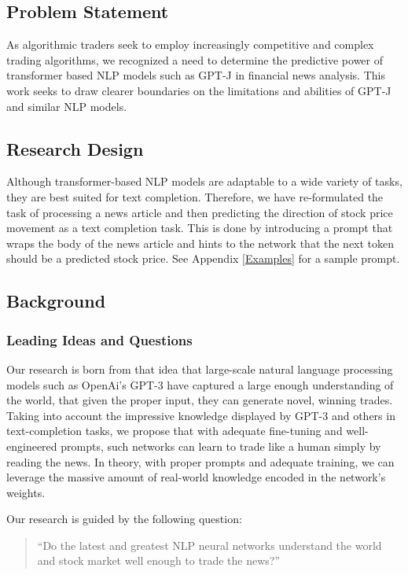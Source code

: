 \documentclass[conference]{IEEEtran}
\begin{document}
\subsection{Problem Statement}
As algorithmic traders seek to employ increasingly competitive and complex trading algorithms, we recognized a need to determine the predictive power of transformer based NLP models such as GPT-J\cite{mesh-transformer-jax} in financial news analysis. This work seeks to draw clearer boundaries on the limitations and abilities of GPT-J and similar NLP models.

\subsection{Research Design}
Although transformer-based NLP models are adaptable to a wide variety of tasks, they are best suited for text completion. Therefore, we have re-formulated the task of processing a news article and then predicting the direction of stock price movement as a text completion task. This is done by introducing a prompt that wraps the body of the news article and hints to the network that the next token should be a predicted stock price. See Appendix \ref{Examples} for a sample prompt.

\subsection{Background}
\subsubsection{Leading Ideas and Questions}
Our research is born from that idea that large-scale natural language processing models such as OpenAi's GPT-3 \cite{Brown2020} have captured a large enough understanding of the world, that given the proper input, they can generate novel, winning trades. Taking into account the impressive knowledge displayed by GPT-3 and others in text-completion tasks, we propose that with adequate fine-tuning and well-engineered prompts, such networks can learn to trade like a human simply by reading the news. In theory, with proper prompts and adequate training, we can leverage the massive amount of real-world knowledge encoded in the network's weights.

Our research is guided by the following question:
\begin{quote}
    ``Do the latest and greatest NLP neural networks understand the world and stock market well enough to trade the news?''
\end{quote}
\end{document}
